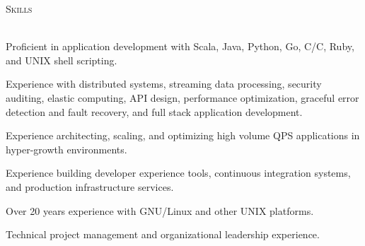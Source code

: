 \documentclass[10pt,letterpaper]{article}
\newcommand{\lineunder}{\vspace*{-8pt} \\ \hspace*{-18pt} \hrulefill \\}
\newcommand{\header}[1]{{\hspace*{-15pt}\vspace*{6pt} \textsc{#1}} \vspace*{-6pt} \lineunder}
\newcommand{\CPP}
{C\nolinebreak[4]\hspace{-.05em}\raisebox{.22ex}{\footnotesize\bf ++}}
\begin{document}
\vspace*{3pt}

\header{Skills}
\vspace*{-5pt}
\begin{itemize*}
\item Proficient in application development with Scala, Java, Python, Go, C/\CPP, Ruby, and UNIX shell scripting. 
\item Experience with distributed systems, streaming data processing, security auditing, elastic
  computing, API design, performance optimization, graceful error detection and
  fault recovery, and full stack application development.
\item Experience architecting, scaling, and optimizing high volume QPS applications in hyper-growth environments.
\item Experience building developer experience tools, continuous integration
  systems, and production infrastructure services.
\item Over 20 years experience with GNU/Linux and other UNIX platforms.
\item Technical project management and organizational leadership experience.
\end{itemize*}
\vspace*{3pt}
\end{document}
